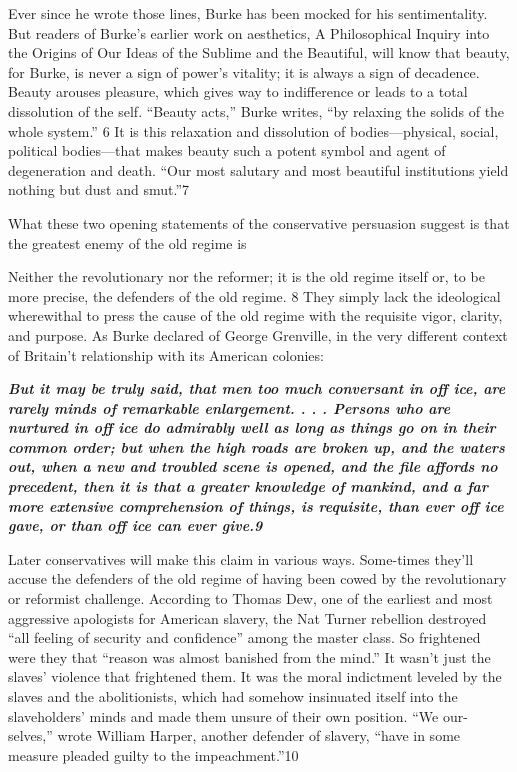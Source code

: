  \par 
Ever since he wrote those lines, Burke has been mocked for his sentimentality. But readers of Burke’s earlier work on aesthetics, A Philosophical Inquiry into the Origins of Our Ideas of the Sublime and the Beautiful, will know that beauty, for Burke, is never a sign of power’s vitality; it is always a sign of decadence. Beauty arouses pleasure, which gives way to indifference or leads to a total dissolution of the self. “Beauty acts,” Burke writes, “by relaxing the solids of the whole system.” {\color{blue}6} It is this relaxation and dissolution of bodies—physical, social, political bodies—that makes beauty such a potent symbol and agent of degeneration and death. “Our most salutary and most beautiful institutions yield nothing but dust and smut.”{\color{blue}7}
 \par 
What these two opening statements of the conservative persuasion suggest is that the greatest enemy of the old regime is
 \par 
Neither the revolutionary nor the reformer; it is the old regime itself or, to be more precise, the defenders of the old regime. {\color{blue}8} They simply lack the ideological wherewithal to press the cause of the old regime with the requisite vigor, clarity, and purpose. As Burke declared of George Grenville, in the very different context of Britain't relationship with its American colonies:
 \par 
\textit\textbf{ {But it may be truly said, that men too much conversant in off ice, are rarely minds of remarkable enlargement. . . . Persons who are nurtured in off ice do admirably well as long as things go on in their common order; but when the high roads are broken up, and the waters out, when a new and troubled scene is opened, and the file affords no precedent, then it is that a greater knowledge of mankind, and a far more extensive comprehension of things, is requisite, than ever off ice gave, or than off ice can ever give.{\color{blue}9}} }
 \par 
Later conservatives will make this claim in various ways. Some-times they’ll accuse the defenders of the old regime of having been cowed by the revolutionary or reformist challenge. According to Thomas Dew, one of the earliest and most aggressive apologists for American slavery, the Nat Turner rebellion destroyed “all feeling of security and confidence” among the master class. So frightened were they that “reason was almost banished from the mind.” It wasn’t just the slaves’ violence that frightened them. It was the moral indictment leveled by the slaves and the abolitionists, which had somehow insinuated itself into the slaveholders’ minds and made them unsure of their own position. “We our-selves,” wrote William Harper, another defender of slavery, “have in some measure pleaded guilty to the impeachment.”{\color{blue}10}
